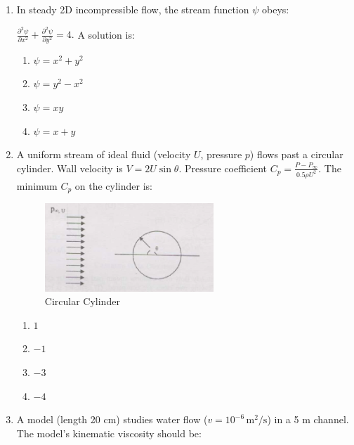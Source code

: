\documentclass[journal,cmex10]{IEEEtran}
\theoremstyle{remark}
\numberwithin{equation}{enumi}
\numberwithin{figure}{enumi}
\begin{document}
\begin{enumerate}[label=\arabic*)]
\vspace{0.5cm}
\item In steady 2D incompressible flow, the stream function $\psi$ obeys:  

$\frac{\partial^2 \psi}{\partial x^2} + \frac{\partial^2 \psi}{\partial y^2} = 4.$ 
A solution is:  
\hfill{}

\begin{enumerate}[label=\alph*)]
    \item $\psi = x^2 + y^2$
    \item $\psi = y^2 - x^2$
    \item $\psi = xy$
    \item $\psi = x + y$
\end{enumerate}

\vspace{0.5cm}
\item A uniform stream of ideal fluid (velocity $U$, pressure $p$) flows past a circular cylinder. Wall velocity is $V = 2U \sin \theta$. Pressure coefficient $C_p = \frac{P - P_\infty}{0.5 \rho U^2}$. The minimum $C_p$ on the cylinder is:  
\begin{figure}[htbp]
  \centering
  \includegraphics[width=0.6\textwidth]{figs/D/fig2.png}
  \caption{Circular Cylinder}
  \label{D/fig2.png}
\end{figure}
\hfill{}

\begin{enumerate}[label=\alph*)]
    \item $1$
    \item $-1$
    \item $-3$
    \item $-4$
\end{enumerate}

\vspace{0.5cm}
\item A model (length 20 cm) studies water flow ($v=10^{-6}\,\text{m}^2/\text{s}$) in a 5 m channel. The model’s kinematic viscosity should be:  
\hfill{}


\end{enumerate}
\end{document}
